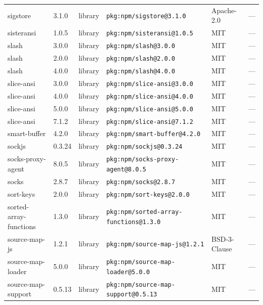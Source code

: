 \documentclass[11pt,a4paper]{article}
\begin{document}
\begin{longtable}{|p{4cm}|p{2cm}|p{1.6cm}|p{5cm}|p{1.5cm}|p{3.5cm}|}
\raggedright sigstore & 3.1.0 & library & \small\texttt{pkg:npm/sigstore@3.1.0} & Apache-2.0 & \small — \\
\raggedright sisteransi & 1.0.5 & library & \small\texttt{pkg:npm/sisteransi@1.0.5} & MIT & \small — \\
\raggedright slash & 3.0.0 & library & \small\texttt{pkg:npm/slash@3.0.0} & MIT & \small — \\
\raggedright slash & 2.0.0 & library & \small\texttt{pkg:npm/slash@2.0.0} & MIT & \small — \\
\raggedright slash & 4.0.0 & library & \small\texttt{pkg:npm/slash@4.0.0} & MIT & \small — \\
\raggedright slice-ansi & 3.0.0 & library & \small\texttt{pkg:npm/slice-ansi@3.0.0} & MIT & \small — \\
\raggedright slice-ansi & 4.0.0 & library & \small\texttt{pkg:npm/slice-ansi@4.0.0} & MIT & \small — \\
\raggedright slice-ansi & 5.0.0 & library & \small\texttt{pkg:npm/slice-ansi@5.0.0} & MIT & \small — \\
\raggedright slice-ansi & 7.1.2 & library & \small\texttt{pkg:npm/slice-ansi@7.1.2} & MIT & \small — \\
\raggedright smart-buffer & 4.2.0 & library & \small\texttt{pkg:npm/smart-buffer@4.2.0} & MIT & \small — \\
\raggedright sockjs & 0.3.24 & library & \small\texttt{pkg:npm/sockjs@0.3.24} & MIT & \small — \\
\raggedright socks-proxy-agent & 8.0.5 & library & \small\texttt{pkg:npm/socks-proxy-agent@8.0.5} & MIT & \small — \\
\raggedright socks & 2.8.7 & library & \small\texttt{pkg:npm/socks@2.8.7} & MIT & \small — \\
\raggedright sort-keys & 2.0.0 & library & \small\texttt{pkg:npm/sort-keys@2.0.0} & MIT & \small — \\
\raggedright sorted-array-functions & 1.3.0 & library & \small\texttt{pkg:npm/sorted-array-functions@1.3.0} & MIT & \small — \\
\raggedright source-map-js & 1.2.1 & library & \small\texttt{pkg:npm/source-map-js@1.2.1} & BSD-3-Clause & \small — \\
\raggedright source-map-loader & 5.0.0 & library & \small\texttt{pkg:npm/source-map-loader@5.0.0} & MIT & \small — \\
\raggedright source-map-support & 0.5.13 & library & \small\texttt{pkg:npm/source-map-support@0.5.13} & MIT & \small — \\

\end{longtable}
\end{document}
